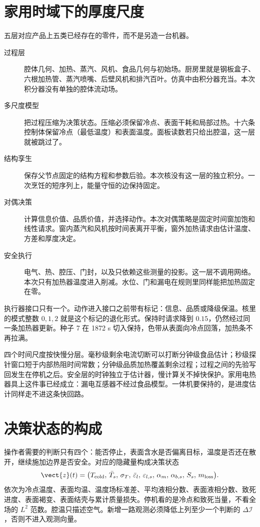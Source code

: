 \section{家用时域下的厚度尺度}

五层对应产品上五类已经存在的零件，而不是另造一台机器。

\begin{description}
\item[过程层] 腔体几何、加热、蒸汽、风机、食品几何与初始场。厨房里就是钢板盒子、六根加热管、蒸汽喷嘴、后壁风机和排汽百叶。仿真中由积分器充当。本次积分器没有单独的腔体流动场。
\item[多尺度模型] 把过程压缩为决策状态。压缩必须保留冷点、表面干耗和局部过热。十六条控制体保留冷点（最低温度）和表面温度。面板读数若只给出腔温，这一层就被跳过了。
\item[结构孪生] 保存父节点固定的结构方程和参数后验。本次核没有这一层的独立积分。一次烹饪的短序列上，能量守恒的边保持固定。
\item[对偶决策] 计算信息价值、品质价值，并选择动作。本次对偶策略是固定时间窗加饱和线性请求。窗内蒸汽和风机按时间表离开平衡，窗外加热请求由估计温度、方差和厚度决定。
\item[安全执行] 电气、热、腔压、门封，以及只依赖这些测量的投影。这一层不调用网络。本次只有加热器温度进入削减。水位、门和漏电在规则里同样能把加热固定在零。
\end{description}

执行器接口只有一个。动作进入接口之前带有标记：信息、品质或降级保温。核里的模式整数 \(0,1,2\) 就是这个标记的退化形式。保持时请求降到 \(0.15\)，仍然经过同一条加热器更新。种子 7 在 1872 s 切入保持，色带从表面向冷点回落，加热条不再拉满。

四个时间尺度按快慢分层。毫秒级剩余电流切断可以打断分钟级食品估计；秒级探针窗口短于内部热阻时间常数；分钟级品质加热覆盖剩余过程；过程之间的先验写回发生在停机之后。安全层的时钟独立于估计器，慢计算关不掉快保护。家用电热器具上这件事已经成立：漏电互感器不经过食品模型。一体机要保持的，是进度估计同样走不进这条快回路。

\section{决策状态的构成}

操作者需要的判断只有四个：能否停止，表面含水是否偏离目标，温度是否还在散开，继续施加边界是否安全。对应的隐藏量构成决策状态
\begin{equation}
\label{eq:z}
\vect{z}(t)=\big(
T_{\mathrm{cold}},\,
\bar T_s,\,
\sigma_T,\,
\bar\varepsilon_l,\,
\varepsilon_{l,s},\,
\alpha_m,\,
\alpha_{b,s},\,
S_s,\,
m_{\mathrm{loss}}
\big).
\end{equation}
依次为冷点温度、表面均温、温度场标准差、平均液相分数、表面液相分数、致死进度、表面褐变、表面结壳与累计质量损失。停机看的是冷点和致死当量，不看全场的 \(L^2\) 范数。腔温只描述空气。新增一路观测必须降低上列至少一个判断的 \(\Delta\mathcal{I}\)，否则不进入观测向量。

